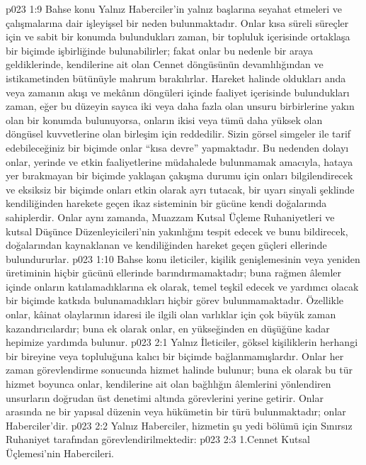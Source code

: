 \vs p023 1:9 Bahse konu Yalnız Haberciler’in yalnız başlarına seyahat etmeleri ve çalışmalarına dair işleyişsel bir neden bulunmaktadır. Onlar kısa süreli süreçler için ve sabit bir konumda bulundukları zaman, bir topluluk içerisinde ortaklaşa bir biçimde işbirliğinde bulunabilirler; fakat onlar bu nedenle bir araya geldiklerinde, kendilerine ait olan Cennet döngüsünün devamlılığından ve istikametinden bütünüyle mahrum bırakılırlar. Hareket halinde oldukları anda veya zamanın akışı ve mekânın döngüleri içinde faaliyet içerisinde bulundukları zaman, eğer bu düzeyin sayıca iki veya daha fazla olan unsuru birbirlerine yakın olan bir konumda bulunuyorsa, onların ikisi veya tümü daha yüksek olan döngüsel kuvvetlerine olan birleşim için reddedilir. Sizin görsel simgeler ile tarif edebileceğiniz bir biçimde onlar “kısa devre” yapmaktadır. Bu nedenden dolayı onlar, yerinde ve etkin faaliyetlerine müdahalede bulunmamak amacıyla, hataya yer bırakmayan bir biçimde yaklaşan çakışma durumu için onları bilgilendirecek ve eksiksiz bir biçimde onları etkin olarak ayrı tutacak, bir uyarı sinyali şeklinde kendiliğinden harekete geçen ikaz sisteminin bir gücüne kendi doğalarında sahiplerdir. Onlar aynı zamanda, Muazzam Kutsal Üçleme Ruhaniyetleri ve kutsal Düşünce Düzenleyicileri’nin yakınlığını tespit edecek ve bunu bildirecek, doğalarından kaynaklanan ve kendiliğinden hareket geçen güçleri ellerinde bulundururlar.
\vs p023 1:10 Bahse konu ileticiler, kişilik genişlemesinin veya yeniden üretiminin hiçbir gücünü ellerinde barındırmamaktadır; buna rağmen âlemler içinde onların katılamadıklarına ek olarak, temel teşkil edecek ve yardımcı olacak bir biçimde katkıda bulunamadıkları hiçbir görev bulunmamaktadır. Özellikle onlar, kâinat olaylarının idaresi ile ilgili olan varlıklar için çok büyük zaman kazandırıcılardır; buna ek olarak onlar, en yükseğinden en düşüğüne kadar hepimize yardımda bulunur.
\vs p023 2:1 Yalnız İleticiler, göksel kişiliklerin herhangi bir bireyine veya topluluğuna kalıcı bir biçimde bağlanmamışlardır. Onlar her zaman görevlendirme sonucunda hizmet halinde bulunur; buna ek olarak bu tür hizmet boyunca onlar, kendilerine ait olan bağlılığın âlemlerini yönlendiren unsurların doğrudan üst denetimi altında görevlerini yerine getirir. Onlar arasında ne bir yapısal düzenin veya hükümetin bir türü bulunmaktadır; onlar  Haberciler’dir.
\vs p023 2:2 Yalnız Haberciler, hizmetin şu yedi bölümü için Sınırsız Ruhaniyet tarafından görevlendirilmektedir:
\vs p023 2:3 1.\bibnobreakspace Cennet Kutsal Üçlemesi’nin Habercileri.

